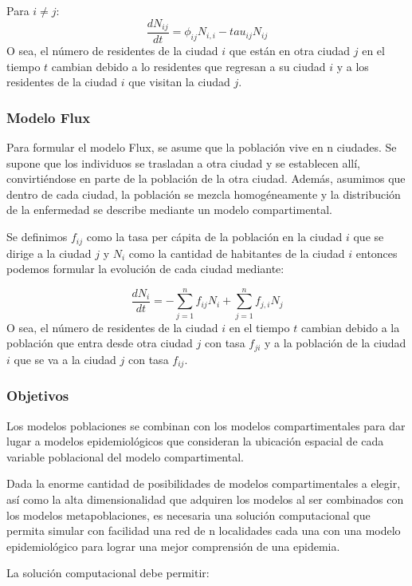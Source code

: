 \documentclass[a4paper,10pt,twocolumn]{article}
\begin{document}
Para $i \ne j$:
$$
	\frac{dN_{ij}}{dt} = \phi_{ij}N_{i,i} - tau_{ij}N_{ij}	
$$
O sea, el n\'umero de residentes de la ciudad $i$ que est\'an en otra ciudad $j$ en el tiempo $t$ cambian debido a lo residentes que regresan a su ciudad $i$ y a los residentes de la ciudad $i$ que visitan la ciudad $j$.

\subsubsection*{Modelo Flux}

Para formular el modelo Flux, se asume que la población vive en n ciudades. Se supone que los individuos se trasladan a otra ciudad y se establecen allí, convirtiéndose en parte de la población de la otra ciudad. Además, asumimos que dentro de cada ciudad, la población se mezcla homogéneamente y la distribución de la enfermedad se describe mediante un modelo compartimental.

Se definimos $f_{ij}$ como la tasa per c\'apita de la poblaci\'on en la ciudad $i$ que se dirige a la ciudad $j$ y $N_i$ como la cantidad de habitantes de la ciudad $i$ entonces podemos formular la evoluci\'on de cada ciudad mediante:

$$
	\frac{dN_i}{dt} = 	-\sum_{j=1}^{n}f_{ij}N_i + \sum_{j=1}^{n} f_{j,i}N_j
$$
O sea, el n\'umero de residentes de la ciudad $i$ en el tiempo $t$ cambian debido a la poblaci\'on que entra desde otra ciudad $j$ con tasa $f_{ji}$ y a la poblaci\'on de la ciudad $i$ que se va a la ciudad $j$ con tasa $f_{ij}$.

\subsubsection*{Objetivos}

Los modelos poblaciones se combinan con los modelos compartimentales para dar lugar a modelos epidemiol\'ogicos que consideran la ubicaci\'on espacial de cada variable poblacional del modelo compartimental.

Dada la enorme cantidad de posibilidades de modelos compartimentales a elegir, as\'i como la alta dimensionalidad que adquiren los modelos al ser combinados con los modelos metapoblaciones, es necesaria una soluci\'on computacional que permita simular con facilidad una red de n localidades cada una con una modelo epidemiol\'ogico para lograr una mejor comprensi\'on de una epidemia.

La soluci\'on computacional debe permitir:
\end{document}
